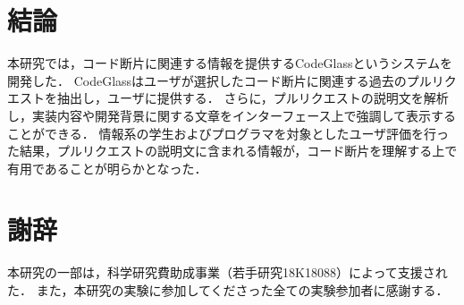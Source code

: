 \section{結論}

本研究では，コード断片に関連する情報を提供するCodeGlassというシステムを開発した．
CodeGlassはユーザが選択したコード断片に関連する過去のプルリクエストを抽出し，ユーザに提供する．
さらに，プルリクエストの説明文を解析し，実装内容や開発背景に関する文章をインターフェース上で強調して表示することができる．
情報系の学生およびプログラマを対象としたユーザ評価を行った結果，プルリクエストの説明文に含まれる情報が，コード断片を理解する上で有用であることが明らかとなった．



\section*{謝辞}

本研究の一部は，科学研究費助成事業（若手研究18K18088）によって支援された．
また，本研究の実験に参加してくださった全ての実験参加者に感謝する．
